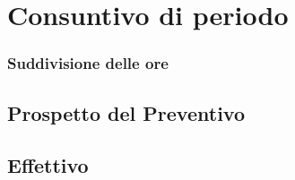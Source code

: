 \section{Consuntivo di periodo}

\subsubsection{Suddivisione delle ore}

\subsection{Prospetto del Preventivo}

\subsection{Effettivo}
